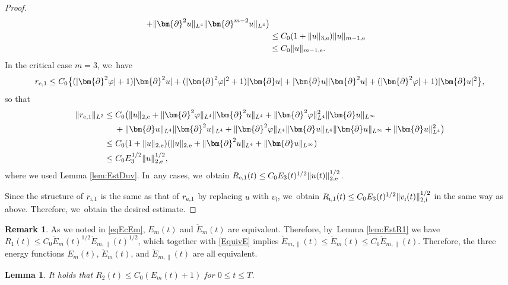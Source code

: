 \documentclass[10pt]{amsart}
\newtheorem{lemma}[theorem]{Lemma}
\theoremstyle{definition}
\newtheorem{remark}[theorem]{Remark}
\begin{document}
\begin{proof}
\begin{align*}
+ \|\bm{\partial}^2u\|_{L^4}\|\bm{\partial}^{m-2}u\|_{L^4} \bigr) \\
&\leq C_0(1+\|u\|_{3,{\rm e}})\|u\|_{m-1,{\rm e}} \\
&\leq C_0\|u\|_{m-1,{\rm e}}.
\end{align*}
In the critical case $m=3$, we~have
\[
r_{{\rm e},1}
\leq C_0 \bigl\{ (|\bm{\partial}^2\varphi|+1)|\bm{\partial}^2u| + (|\bm{\partial}^2\varphi|^2+1)|\bm{\partial}u|
+ |\bm{\partial}u||\bm{\partial}^2u| + (|\bm{\partial}^2\varphi|+1)|\bm{\partial}u|^2\bigr\},
\]
so that
\begin{align*}
\|r_{{\rm e},1}\|_{L^2}
&\leq C_0 \bigl(\|u\|_{2,{\rm e}} + \|\bm{\partial}^2\varphi\|_{L^4}\|\bm{\partial}^2u\|_{L^4} + \|\bm{\partial}^2\varphi\|_{L^4}^2\|\bm{\partial}u\|_{L^\infty} \\
&\quad\;
+ \|\bm{\partial}u\|_{L^4}\|\bm{\partial}^2u\|_{L^4} + \|\bm{\partial}^2\varphi\|_{L^4}\|\bm{\partial}u\|_{L^4}\|\bm{\partial}u\|_{L^\infty}
+ \|\bm{\partial}u\|_{L^4}^2 \bigr) \\
&\leq C_0 (1+\|u\|_{2,{\rm e}})(\|u\|_{2,{\rm e}}+\|\bm{\partial}^2u\|_{L^4}+\|\bm{\partial}u\|_{L^\infty}) \\
&\leq C_0 E_3^{1/2} \|u\|_{2,{\rm e}}^{1/2},
\end{align*}
where we used Lemma \ref{lem:EstDuv}. In~any cases, we~obtain $R_{{\rm e},1}(t) \leq C_0 E_3(t)^{1/2} \|u(t)\|_{2,{\rm e}}^{1/2}$.

Since the structure of $r_{{\rm i},1}$ is the same as that of $r_{{\rm e},1}$ by replacing $u$ with $v_\mathrm{i}$, we~obtain $R_{{\rm i},1}(t) \leq C_0 E_3(t)^{1/2} \|v_\mathrm{i}(t)\|_{2,{\rm i}}^{1/2}$ in the same way as above.
Therefore, we~obtain the desired estimate.
\end{proof}

\begin{remark}\label{re:EFs}
As we noted in \eqref{eqEcEm}, $E_m(t)$ and $\check{E}_m(t)$ are equivalent.
Therefore, by~Lemma \ref{lem:EstR1} we have $R_1(t) \leq C_0\check{E}_m(t)^{1/2}\check{E}_{m,\parallel}(t)^{1/2}$,
which together with \eqref{EquivE} implies $\check{E}_{m,\parallel}(t) \leq \check{E}_m(t) \leq C_0\check{E}_{m,\parallel}(t)$.
Therefore, the three energy functions $E_m(t)$, $\check{E}_m(t)$, and $\check{E}_{m,\parallel}(t)$ are all equivalent.
\end{remark}

\begin{lemma}\label{lem:EstR2}
It holds that $R_2(t) \leq C_0(E_m(t)+1)$ for $0\leq t\leq T$.
\end{lemma}
\end{document}

